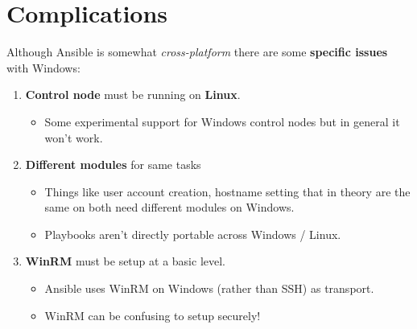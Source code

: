 \documentclass[slides]{pgnotes}
\begin{document}
\section{Complications}

Although Ansible is somewhat \textit{cross-platform} there are some \textbf{specific issues} with Windows:

\begin{enumerate}

\item \textbf{Control node} must be running on \textbf{Linux}.

\begin{itemize}
\item Some experimental support for Windows control nodes but in general it won't work.
\end{itemize}

\item \textbf{Different modules} for same tasks

\begin{itemize}
\item Things like user account creation, hostname setting that in theory are the same on both need different modules on Windows.
\item Playbooks aren't directly portable across Windows / Linux.
\end{itemize}

\item \textbf{WinRM} must be setup at a basic level.

\begin{itemize}
\item Ansible uses WinRM on Windows (rather than SSH) as transport.
\item WinRM can be confusing to setup securely!
\end{itemize}

\end{enumerate}
\end{document}
